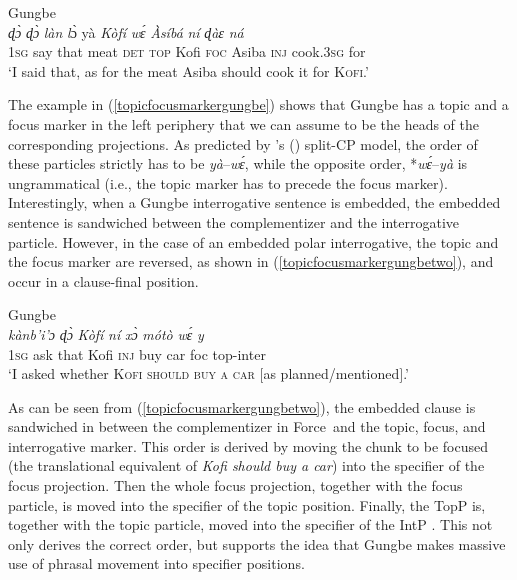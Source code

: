 \begin{exe}
\ex Gungbe \citep[168]{aboh2004left} \\ { {\textit{ɖɔ̀}} {\textit{ɖɔ̀}} {\textit{làn}} {\textit{l}ɔ̀} {yà} {\textit{Kòfí}} {\textit{wɛ́}} {\textit{Àsíbá}} {\textit{ní}} {\textit{ɖ}\textit{àɛ}} {\textit{n\'{a}}}  \\
{1\textsc{sg}} {say} {that} {meat} {\textsc{det}} {\textsc{top}} {Kofi} {\textsc{foc}} {Asiba} {\textsc{inj}} {cook.\textsc{3sg}} {for} \\
\trans `I said that, as for the meat Asiba should cook it for \textsc{Kofi}.' \label{topicfocusmarkergungbe} }
\end{exe}

\noindent The example in (\ref{topicfocusmarkergungbe}) shows that Gungbe has a topic and a focus marker in the left periphery that we can assume to be the heads of the corresponding projections. As predicted by \citeauthor{rizzi1997fine}'s (\citeyear{rizzi1997fine}) split-CP model, the order of these particles strictly has to be \textit{yà}--\textit{wɛ́}, while the opposite order, *\textit{wɛ́}--\textit{yà} is ungrammatical (i.e., the topic marker has to precede the focus marker). Interestingly, when a Gungbe interrogative sentence is embedded, the embedded sentence is sandwiched between the complementizer and the interrogative particle. However, in the case of an embedded polar interrogative, the topic and the focus marker are reversed, as shown in (\ref{topicfocusmarkergungbetwo}), and occur in a clause-final position.

\begin{exe}
\ex Gungbe \citep[184]{aboh2004left} \\ { {\textit{kànb'{i}'{ɔ}}} {\textit{ɖɔ̀}} {\textit{Kòfí}} {\textit{ní}} {\textit{xɔ̀}} {\textit{mótò}} {\textit{wɛ́}} {\textit{y}}  \\
{1\textsc{sg}} {ask} {that} {Kofi} {\textsc{inj}} {buy} {car} {foc} {top-inter}  \\
\trans `I asked whether \textsc{Kofi should buy a car} $[$as planned/mentioned$]$.' \label{topicfocusmarkergungbetwo} }
\end{exe}


\noindent As can be seen from (\ref{topicfocusmarkergungbetwo}), the embedded clause is sandwiched in between the complementizer in Force\textdegree\ and the topic, focus, and interrogative marker. This order is derived by moving the chunk to be focused (the translational equivalent of \textit{Kofi should buy a car}) into the specifier of the focus projection. Then the whole focus projection, together with the focus particle, is moved into the specifier of the topic position. Finally, the TopP is, together with the topic particle, moved into the specifier of the IntP \citep[184]{aboh2004left}. This not only derives the correct order, but supports the idea that Gungbe makes massive use of phrasal movement into specifier positions.


